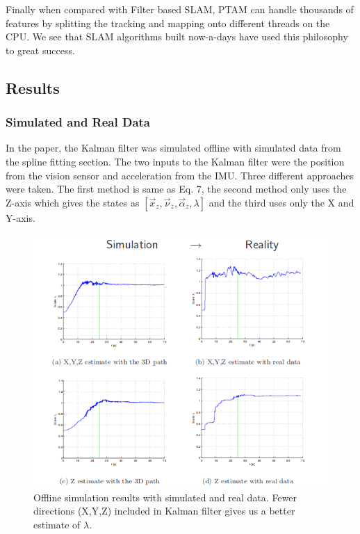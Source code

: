 Finally when compared with Filter based SLAM, PTAM can handle thousands of features by splitting the tracking and mapping onto different threads on the CPU. We see that SLAM algorithms built now-a-days have used this philosophy to great success. 

\subsection{Results}
\subsubsection{Simulated and Real Data}

In the paper, the Kalman filter was simulated offline with simulated data from the spline fitting section. The two inputs to the Kalman filter were the position from the vision sensor and acceleration from the IMU. Three different approaches were taken. The first method is same as Eq. 7, the second method only uses the Z-axis which gives the states as $[\overrightarrow{x}_z, \overrightarrow{\nu}_z, \overrightarrow{\alpha}_z, \lambda]$ and the third uses only the X and Y-axis. 

\begin{figure}
  \includegraphics[width=\textwidth]{./figures/ekfTest.png}
\caption{Offline simulation results with simulated and real data. Fewer directions (X,Y,Z) included in Kalman filter gives us a better estimate of $\lambda$.~\cite{nutzi2011fusion}}
\label{fig:ekf1}       %
\end{figure}

